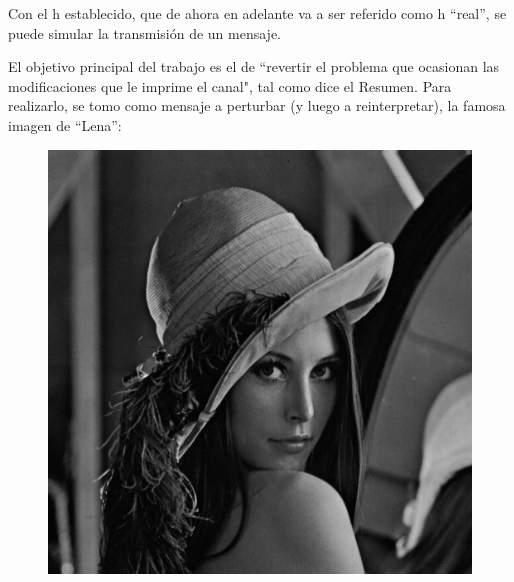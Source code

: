 \documentclass{article}
\begin{document}
\begin{multicols}{2}

\par Con el h establecido, que de ahora en adelante va a ser referido como h “real”, se puede simular la transmisión de un mensaje. 
\par El objetivo principal del trabajo es el de “revertir el problema que ocasionan las modificaciones que le imprime el canal", tal como dice el Resumen. Para realizarlo, se tomo como mensaje a perturbar (y luego a reinterpretar),  la famosa imagen de “Lena”:
\begin{figure}[H]
\centering
\includegraphics[scale=0.2]{../img/lena512.png}

\end{figure}
\end{multicols}
\end{document}
